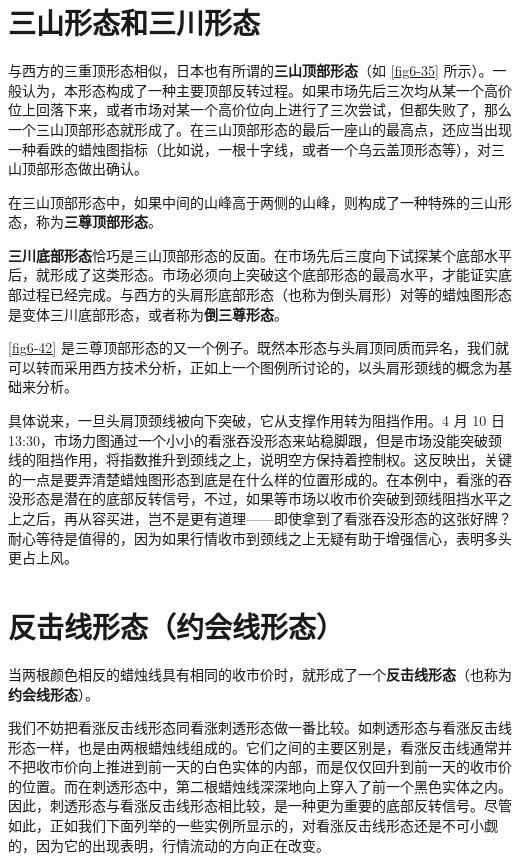 \section{三山形态和三川形态}
与西方的三重顶形态相似，日本也有所谓的\textbf{三山顶部形态}（如 \autoref{fig6-35} 所示）。一般认为，本形态构成了一种主要顶部反转过程。如果市场先后三次均从某一个高价位上回落下来，或者市场对某一个高价位向上进行了三次尝试，但都失败了，那么一个三山顶部形态就形成了。在三山顶部形态的最后一座山的最高点，还应当出现一种看跌的蜡烛图指标（比如说，一根十字线，或者一个乌云盖顶形态等），对三山顶部形态做出确认。

在三山顶部形态中，如果中间的山峰高于两侧的山峰，则构成了一种特殊的三山形态，称为\textbf{三尊顶部形态}。


\textbf{三川底部形态}恰巧是三山顶部形态的反面。在市场先后三度向下试探某个底部水平后，就形成了这类形态。市场必须向上突破这个底部形态的最高水平，才能证实底部过程已经完成。与西方的头肩形底部形态（也称为倒头肩形）对等的蜡烛图形态是变体三川底部形态，或者称为\textbf{倒三尊形态}。

\autoref{fig6-42} 是三尊顶部形态的又一个例子。既然本形态与头肩顶同质而异名，我们就可以转而采用西方技术分析，正如上一个图例所讨论的，以头肩形颈线的概念为基础来分析。

具体说来，一旦头肩顶颈线被向下突破，它从支撑作用转为阻挡作用。4 月 10 日 13:30，市场力图通过一个小小的看涨吞没形态来站稳脚跟，但是市场没能突破颈线的阻挡作用，将指数推升到颈线之上，说明空方保持着控制权。这反映出，关键的一点是要弄清楚蜡烛图形态到底是在什么样的位置形成的。在本例中，看涨的吞没形态是潜在的底部反转信号，不过，如果等市场以收市价突破到颈线阻挡水平之上之后，再从容买进，岂不是更有道理——即使拿到了看涨吞没形态的这张好牌？耐心等待是值得的，因为如果行情收市到颈线之上无疑有助于增强信心，表明多头更占上风。


\section{反击线形态（约会线形态）}
当两根颜色相反的蜡烛线具有相同的收市价时，就形成了一个\textbf{反击线形态}（也称为\textbf{约会线形态}）。

我们不妨把看涨反击线形态同看涨刺透形态做一番比较。如刺透形态与看涨反击线形态一样，也是由两根蜡烛线组成的。它们之间的主要区别是，看涨反击线通常并不把收市价向上推进到前一天的白色实体的内部，而是仅仅回升到前一天的收市价的位置。而在刺透形态中，第二根蜡烛线深深地向上穿入了前一个黑色实体之内。因此，刺透形态与看涨反击线形态相比较，是一种更为重要的底部反转信号。尽管如此，正如我们下面列举的一些实例所显示的，对看涨反击线形态还是不可小觑的，因为它的出现表明，行情流动的方向正在改变。

